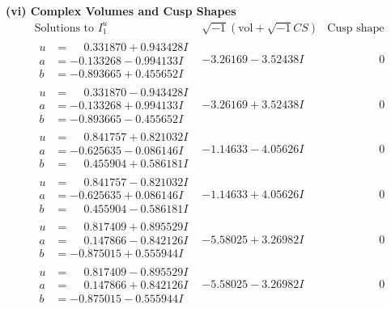 \documentclass[1p]{elsarticle_modified}
\theoremstyle{definition}
\newcommand{\I}{\sqrt{-1}}
\begin{document}
\newpage\flushleft \textbf{(vi) Complex Volumes and Cusp Shapes}
$$\begin{array}{c|c|c}  
\text{Solutions to }I^u_{1}& \I (\text{vol} + \sqrt{-1}CS) & \text{Cusp shape}\\
 \hline 
\begin{aligned}
u &= \phantom{-}0.331870 + 0.943428 I \\
a &= -0.133268 - 0.994133 I \\
b &= -0.893665 + 0.455652 I\end{aligned}
 & -3.26169 - 3.52438 I & \phantom{-0.000000 } 0 \\ \hline\begin{aligned}
u &= \phantom{-}0.331870 - 0.943428 I \\
a &= -0.133268 + 0.994133 I \\
b &= -0.893665 - 0.455652 I\end{aligned}
 & -3.26169 + 3.52438 I & \phantom{-0.000000 } 0 \\ \hline\begin{aligned}
u &= \phantom{-}0.841757 + 0.821032 I \\
a &= -0.625635 - 0.086146 I \\
b &= \phantom{-}0.455904 + 0.586181 I\end{aligned}
 & -1.14633 - 4.05626 I & \phantom{-0.000000 } 0 \\ \hline\begin{aligned}
u &= \phantom{-}0.841757 - 0.821032 I \\
a &= -0.625635 + 0.086146 I \\
b &= \phantom{-}0.455904 - 0.586181 I\end{aligned}
 & -1.14633 + 4.05626 I & \phantom{-0.000000 } 0 \\ \hline\begin{aligned}
u &= \phantom{-}0.817409 + 0.895529 I \\
a &= \phantom{-}0.147866 - 0.842126 I \\
b &= -0.875015 + 0.555944 I\end{aligned}
 & -5.58025 + 3.26982 I & \phantom{-0.000000 } 0 \\ \hline\begin{aligned}
u &= \phantom{-}0.817409 - 0.895529 I \\
a &= \phantom{-}0.147866 + 0.842126 I \\
b &= -0.875015 - 0.555944 I\end{aligned}
 & -5.58025 - 3.26982 I & \phantom{-0.000000 } 0 \\ \hline\begin{aligned}

\end{aligned}
\end{array}$$
\end{document}
